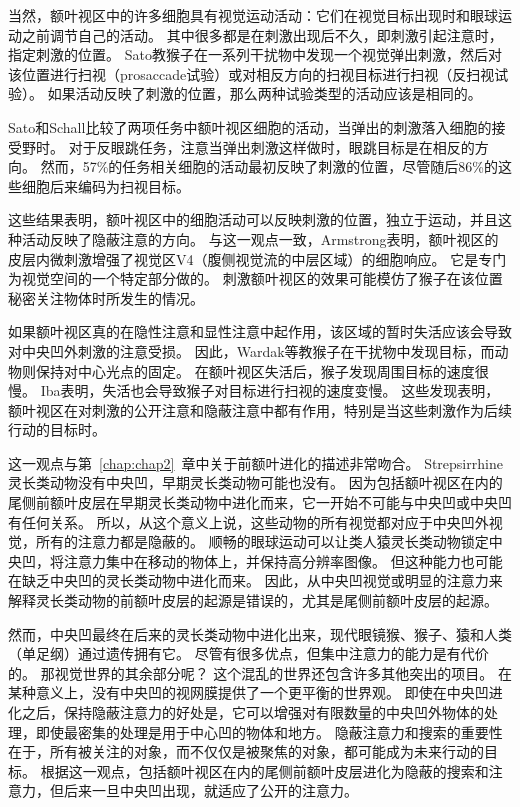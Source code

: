 当然，额叶视区中的许多细胞具有视觉运动活动：它们在视觉目标出现时和眼球运动之前调节自己的活动\cite{schall1991neuronal}。
其中很多都是在刺激出现后不久，即刺激引起注意时，指定刺激的位置。
Sato\cite{sato2003effects}教猴子在一系列干扰物中发现一个视觉弹出刺激，然后对该位置进行扫视（prosaccade试验）或对相反方向的扫视目标进行扫视（反扫视试验）。
如果活动反映了刺激的位置，那么两种试验类型的活动应该是相同的。


Sato和Schall比较了两项任务中额叶视区细胞的活动，当弹出的刺激落入细胞的接受野时。
对于反眼跳任务，注意当弹出刺激这样做时，眼跳目标是在相反的方向。
然而，57\%的任务相关细胞的活动最初反映了刺激的位置，尽管随后86\%的这些细胞后来编码为扫视目标。


这些结果表明，额叶视区中的细胞活动可以反映刺激的位置，独立于运动，并且这种活动反映了隐蔽注意的方向。
与这一观点一致，Armstrong\cite{armstrong2007rapid}表明，额叶视区的皮层内微刺激增强了视觉区V4（腹侧视觉流的中层区域）的细胞响应。
它是专门为视觉空间的一个特定部分做的。
刺激额叶视区的效果可能模仿了猴子在该位置秘密关注物体时所发生的情况。


如果额叶视区真的在隐性注意和显性注意中起作用，该区域的暂时失活应该会导致对中央凹外刺激的注意受损。
因此，Wardak等\cite{wardak2004deficit}教猴子在干扰物中发现目标，而动物则保持对中心光点的固定。
在额叶视区失活后，猴子发现周围目标的速度很慢。
Iba\cite{iba2003involvement}表明，失活也会导致猴子对目标进行扫视的速度变慢。
这些发现表明，额叶视区在对刺激的公开注意和隐蔽注意中都有作用，特别是当这些刺激作为后续行动的目标时。


这一观点与第~\ref{chap:chap2}~章中关于前额叶进化的描述非常吻合。
Strepsirrhine灵长类动物没有中央凹，早期灵长类动物可能也没有。
因为包括额叶视区在内的尾侧前额叶皮层在早期灵长类动物中进化而来，它一开始不可能与中央凹或中央凹有任何关系。
所以，从这个意义上说，这些动物的所有视觉都对应于中央凹外视觉，所有的注意力都是隐蔽的。
顺畅的眼球运动可以让类人猿灵长类动物锁定中央凹，将注意力集中在移动的物体上，并保持高分辨率图像。
但这种能力也可能在缺乏中央凹的灵长类动物中进化而来\cite{shepherd2009neuroethology}。
因此，从中央凹视觉或明显的注意力来解释灵长类动物的前额叶皮层的起源是错误的，尤其是尾侧前额叶皮层的起源。


然而，中央凹最终在后来的灵长类动物中进化出来，现代眼镜猴、猴子、猿和人类（单足纲）通过遗传拥有它。
尽管有很多优点，但集中注意力的能力是有代价的。
那视觉世界的其余部分呢？
这个混乱的世界还包含许多其他突出的项目。
在某种意义上，没有中央凹的视网膜提供了一个更平衡的世界观。
即使在中央凹进化之后，保持隐蔽注意力的好处是，它可以增强对有限数量的中央凹外物体的处理，即使最密集的处理是用于中心凹的物体和地方。
隐蔽注意力和搜索的重要性在于，所有被关注的对象，而不仅仅是被聚焦的对象，都可能成为未来行动的目标。
根据这一观点，包括额叶视区在内的尾侧前额叶皮层进化为隐蔽的搜索和注意力，但后来一旦中央凹出现，就适应了公开的注意力。



